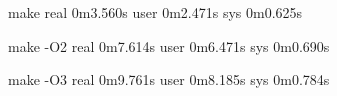 \documentclass[11pt,a4paper]{article}
\begin{document}
make
real	0m3.560s
user	0m2.471s
sys	0m0.625s

make -O2
real	0m7.614s
user	0m6.471s
sys	0m0.690s

make -O3
real	0m9.761s
user	0m8.185s
sys	0m0.784s



   




\end{document}
